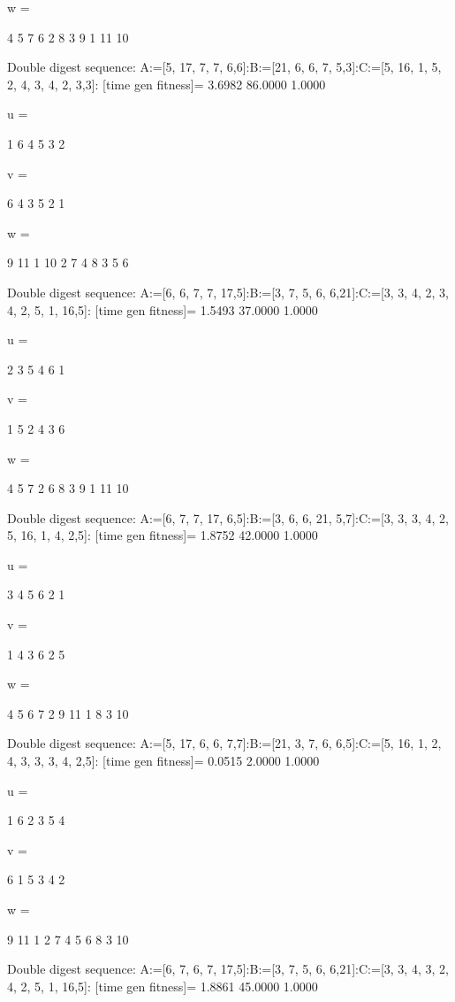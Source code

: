 w =

     4     5     7     6     2     8     3     9     1    11    10

Double digest sequence:
A:=[5, 17, 7, 7, 6,6]:B:=[21, 6, 6, 7, 5,3]:C:=[5, 16, 1, 5, 2, 4, 3, 4, 2, 3,3]:
[time gen fitness]=
    3.6982   86.0000    1.0000


u =

     1     6     4     5     3     2


v =

     6     4     3     5     2     1


w =

     9    11     1    10     2     7     4     8     3     5     6

Double digest sequence:
A:=[6, 6, 7, 7, 17,5]:B:=[3, 7, 5, 6, 6,21]:C:=[3, 3, 4, 2, 3, 4, 2, 5, 1, 16,5]:
[time gen fitness]=
    1.5493   37.0000    1.0000


u =

     2     3     5     4     6     1


v =

     1     5     2     4     3     6


w =

     4     5     7     2     6     8     3     9     1    11    10

Double digest sequence:
A:=[6, 7, 7, 17, 6,5]:B:=[3, 6, 6, 21, 5,7]:C:=[3, 3, 3, 4, 2, 5, 16, 1, 4, 2,5]:
[time gen fitness]=
    1.8752   42.0000    1.0000


u =

     3     4     5     6     2     1


v =

     1     4     3     6     2     5


w =

     4     5     6     7     2     9    11     1     8     3    10

Double digest sequence:
A:=[5, 17, 6, 6, 7,7]:B:=[21, 3, 7, 6, 6,5]:C:=[5, 16, 1, 2, 4, 3, 3, 3, 4, 2,5]:
[time gen fitness]=
    0.0515    2.0000    1.0000


u =

     1     6     2     3     5     4


v =

     6     1     5     3     4     2


w =

     9    11     1     2     7     4     5     6     8     3    10

Double digest sequence:
A:=[6, 7, 6, 7, 17,5]:B:=[3, 7, 5, 6, 6,21]:C:=[3, 3, 4, 3, 2, 4, 2, 5, 1, 16,5]:
[time gen fitness]=
    1.8861   45.0000    1.0000


